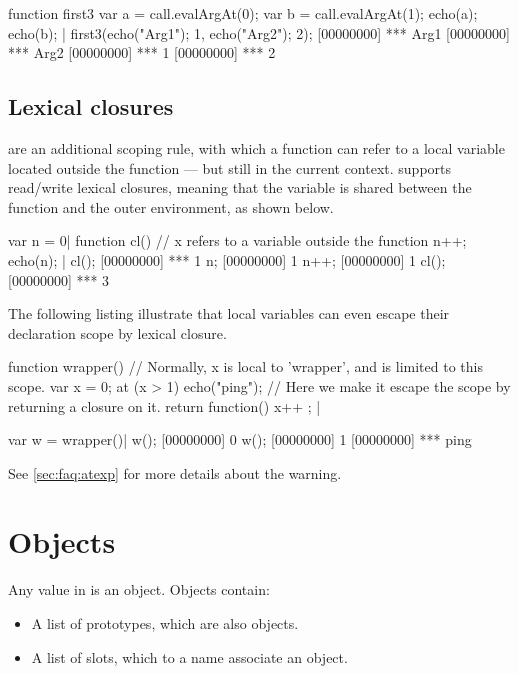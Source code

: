 \begin{urbiscript}
function first3
{
  var a = call.evalArgAt(0);
  var b = call.evalArgAt(1);
  echo(a); echo(b);
}|
first3({echo("Arg1"); 1},
       {echo("Arg2"); 2});
[00000000] *** Arg1
[00000000] *** Arg2
[00000000] *** 1
[00000000] *** 2
\end{urbiscript}

\subsection{Lexical closures}
\label{sec:us-fun-closures}

 are an additional scoping rule, with which a function
can refer to a local variable located outside the function --- but still
in the current context. \us supports read/write lexical closures,
meaning that the variable is shared between the function and the outer
environment, as shown below.

\begin{urbiscript}
var n = 0|
function cl()
{
  // x refers to a variable outside the function
  n++;
  echo(n);
}|
cl();
[00000000] *** 1
n;
[00000000] 1
n++;
[00000000] 1
cl();
[00000000] *** 3
\end{urbiscript}

The following listing illustrate that local variables can even
escape their declaration scope by lexical closure.

\begin{urbiscript}
function wrapper()
{
  // Normally, x is local to 'wrapper', and is limited to this scope.
  var x = 0;
  at (x > 1)
    echo("ping");
  // Here we make it escape the scope by returning a closure on it.
  return function() { x++ };
} |

var w = wrapper()|
w();
[00000000] 0
w();
[00000000] 1
[00000000] *** ping
\end{urbiscript}

See \autoref{sec:faq:atexp} for more details about the warning.


\section{Objects}

Any value in \us is an object. Objects contain:

\begin{itemize}
\item A list of prototypes, which are also objects.
\item A list of slots, which to a name associate an object.
\end{itemize}

